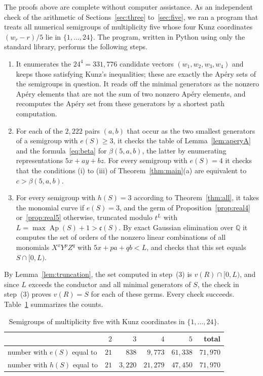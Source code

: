 \documentclass{amsart}
\theoremstyle{definition}
\theoremstyle{remark}
\numberwithin{equation}{section}
\newcommand{\Ap}{\operatorname{Ap}}
\newcommand{\cond}{\mathfrak{c}}
\begin{document}
The proofs above are complete without computer assistance. As an independent check of the arithmetic of Sections~\ref{sec:three} to~\ref{sec:five}, we ran a program that treats all numerical semigroups of multiplicity five whose four Kunz coordinates $(w_r-r)/5$ lie in $\{1,\dots,24\}$. The program, written in Python using only the standard library, performs the following steps.
\begin{enumerate}
\item It enumerates the $24^4=331{,}776$ candidate vectors $(w_1,w_2,w_3,w_4)$ and keeps those satisfying Kunz's inequalities; these are exactly the Ap\'ery sets of the semigroups in question. It reads off the minimal generators as the nonzero Ap\'ery elements that are not the sum of two nonzero Ap\'ery elements, and recomputes the Ap\'ery set from these generators by a shortest path computation.
\item For each of the $2{,}222$ pairs $(a,b)$ that occur as the two smallest generators of a semigroup with $e(S)\ge3$, it checks the table of Lemma~\ref{lem:aperyA} and the formula~\eqref{eq:beta} for $\beta(5,a,b)$, the latter by enumerating representations $5x+ay+bz$. For every semigroup with $e(S)=4$ it checks that the conditions (i) to (iii) of Theorem~\ref{thm:main}(a) are equivalent to $c>\beta(5,a,b)$.
\item For every semigroup with $h(S)=3$ according to Theorem~\ref{thm:all}, it takes the monomial curve if $e(S)=3$, and the germ of Proposition~\ref{prop:real4} or~\ref{prop:real5} otherwise, truncated modulo $t^L$ with $L=\max\Ap(S)+1>\cond(S)$. By exact Gaussian elimination over $\mathbb{Q}$ it computes the set of orders of the nonzero linear combinations of all monomials $X^xY^pZ^q$ with $5x+pa+qb<L$, and checks that this set equals $S\cap[0,L)$.
\end{enumerate}
By Lemma~\ref{lem:truncation}, the set computed in step~(3) is $v(R)\cap[0,L)$, and since $L$ exceeds the conductor and all minimal generators of $S$, the check in step~(3) proves $v(R)=S$ for each of these germs. Every check succeeds. Table~\ref{tab:counts} summarizes the counts.

\begin{table}[ht]
\caption{Semigroups of multiplicity five with Kunz coordinates in $\{1,\dots,24\}$.}\label{tab:counts}
\begin{tabular}{lrrrrr}
\toprule
 & $2$ & $3$ & $4$ & $5$ & total\\
\midrule
number with $e(S)$ equal to & $21$ & $838$ & $9{,}773$ & $61{,}338$ & $71{,}970$\\
number with $h(S)$ equal to & $21$ & $3{,}220$ & $21{,}279$ & $47{,}450$ & $71{,}970$\\
\bottomrule
\end{tabular}
\end{table}
\end{document}

